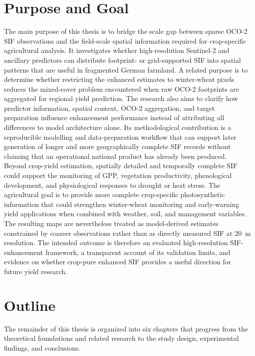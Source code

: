 \section{Purpose and Goal\label{sec:purpose_and_goal}}
The main purpose of this thesis is to bridge the scale gap between sparse OCO-2 SIF observations and the field-scale spatial information required for crop-specific agricultural analysis. It investigates whether high-resolution Sentinel-2 and ancillary predictors can distribute footprint- or grid-supported SIF into spatial patterns that are useful in fragmented German farmland. A related purpose is to determine whether restricting the enhanced estimates to winter-wheat pixels reduces the mixed-cover problem encountered when raw OCO-2 footprints are aggregated for regional yield prediction. The research also aims to clarify how predictor information, spatial context, OCO-2 aggregation, and target preparation influence enhancement performance instead of attributing all differences to model architecture alone. Its methodological contribution is a reproducible modelling and data-preparation workflow that can support later generation of longer and more geographically complete SIF records without claiming that an operational national product has already been produced. Beyond crop-yield estimation, spatially detailed and temporally complete SIF could support the monitoring of GPP, vegetation productivity, phenological development, and physiological responses to drought or heat stress. The agricultural goal is to provide more complete crop-specific photosynthetic information that could strengthen winter-wheat monitoring and early-warning yield applications when combined with weather, soil, and management variables. The resulting maps are nevertheless treated as model-derived estimates constrained by coarser observations rather than as directly measured SIF at 20~m resolution. The intended outcome is therefore an evaluated high-resolution SIF-enhancement framework, a transparent account of its validation limits, and evidence on whether crop-pure enhanced SIF provides a useful direction for future yield research.


\section{Outline\label{sec:outline}}

The remainder of this thesis is organized into six chapters that progress from the theoretical foundations and related research to the study design, experimental findings, and conclusions.

